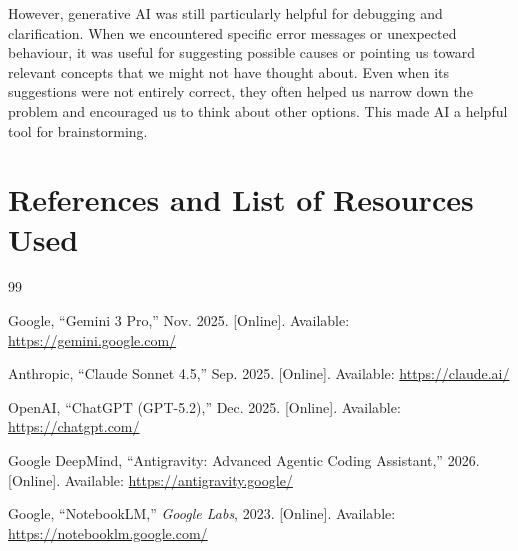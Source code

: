 \documentclass{article}
\begin{document}
However, generative AI was still particularly helpful for debugging and clarification. When we encountered specific error messages or unexpected behaviour, it was useful for suggesting possible causes or pointing us toward relevant concepts that we might not have thought about. Even when its suggestions were not entirely correct, they often helped us narrow down the problem and encouraged us to think about other options. This made AI a helpful tool for brainstorming.


\newpage{}
\section{References and List of Resources Used}

\begin{thebibliography}{99}

    Google, ``Gemini 3 Pro,'' Nov. 2025. [Online]. Available: \url{https://gemini.google.com/}

    Anthropic, ``Claude Sonnet 4.5,'' Sep. 2025. [Online]. Available: \url{https://claude.ai/}

    OpenAI, ``ChatGPT (GPT-5.2),'' Dec. 2025. [Online]. Available: \url{https://chatgpt.com/}


    Google DeepMind, ``Antigravity: Advanced Agentic Coding Assistant,'' 2026. [Online]. Available: \url{https://antigravity.google/}

    Google, ``NotebookLM,'' \textit{Google Labs}, 2023. [Online]. Available: \url{https://notebooklm.google.com/}
\end{thebibliography}
\end{document}
